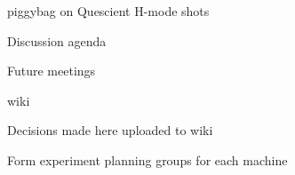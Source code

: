 \documentclass[10pt, compress]{beamer}
\begin{document}
\begin{frame}{piggybag on Quescient H-mode shots}
\end{frame}

\begin{frame}{Discussion agenda}
	
\end{frame}

\begin{frame}{Future}
	meetings
	
	wiki 
	
	Decisions made here uploaded to wiki 
	
	Form experiment planning groups for each machine
	
\end{frame}
\end{document}
